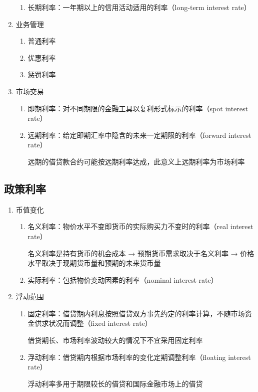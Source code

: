 \documentclass[12pt]{book}
\begin{document}
\begin{enumerate}[1.]
\begin{enumerate}[(1)]
              \item 长期利率：一年期以上的信用活动适用的利率（long-term interest rate）
          \end{enumerate}
    \item 业务管理
          \begin{enumerate}[(1)]
              \item 普通利率
              \item 优惠利率
              \item 惩罚利率
          \end{enumerate}
    \item 市场交易
          \begin{enumerate}[(1)]
              \item 即期利率：对不同期限的金融工具以复利形式标示的利率（spot interest rate）
              \item 远期利率：给定即期汇率中隐含的未来一定期限的利率（forward interest rate）
                    \par  远期的借贷款合约可能按远期利率达成，此意义上远期利率为市场利率
          \end{enumerate}
\end{enumerate}


\subsection{政策利率}

\begin{enumerate}[1.]
    \item 币值变化
          \begin{enumerate}[(1)]
              \item 名义利率：物价水平不变即货币的实际购买力不变时的利率（real interest rate）
                    \par 名义利率是持有货币的机会成本 → 预期货币需求取决于名义利率 → 价格水平取决于现期货币量和预期的未来货币量
              \item 实际利率：包括物价变动因素的利率（nominal interest rate）
          \end{enumerate}
    \item 浮动范围
          \begin{enumerate}[(1)]
              \item 固定利率：借贷期内利息按照借贷双方事先约定的利率计算，不随市场资金供求状况而调整（fixed interest rate）
                    \par 借贷期长、市场利率波动较大的情况下不宜采用固定利率
              \item 浮动利率：借贷期内根据市场利率的变化定期调整利率（floating interest rate）
                    \par 浮动利率多用于期限较长的借贷和国际金融市场上的借贷
          \end{enumerate}
\end{enumerate}
\end{document}
